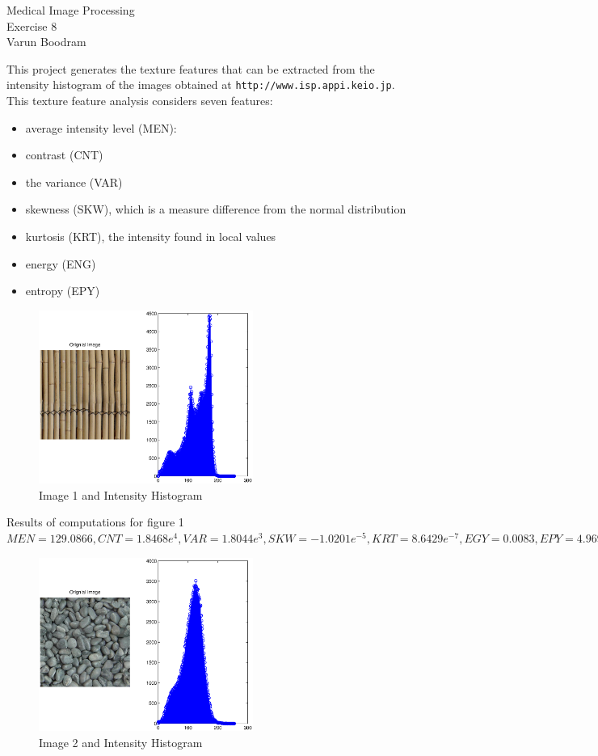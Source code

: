 \documentclass[10pt]{article}
\begin{document}
\begin{flushright}
Medical Image Processing \\
Exercise 8\\
Varun Boodram
\end {flushright}

This project generates the texture features that can be extracted from the intensity histogram of the images obtained at \texttt{http://www.isp.appi.keio.jp}. This texture feature analysis considers seven features: \\
\begin{itemize}
\item  average intensity level (MEN): 
\item contrast (CNT)
\item the variance (VAR)
\item skewness (SKW), which is a measure difference from the normal distribution
\item kurtosis (KRT), the intensity found in local values
\item energy (ENG)
\item entropy (EPY)
\end{itemize}

\begin{figure}[h!]
\centering
\includegraphics[width=70mm]{Image1.eps}
\caption{Image 1 and Intensity Histogram}
\end{figure} 

Results of computations for figure 1 \\
$MEN =129.0866, CNT =1.8468e^4, VAR =1.8044e^3, SKW = -1.0201e^{-5},               KRT =8.6429e^{-7}, EGY =0.0083, EPY =4.9694$\\


\begin{figure}[h!]
\centering
\includegraphics[width=70mm]{Image2.eps}
\caption{Image 2 and Intensity Histogram}
\end{figure} 
\end{document}
